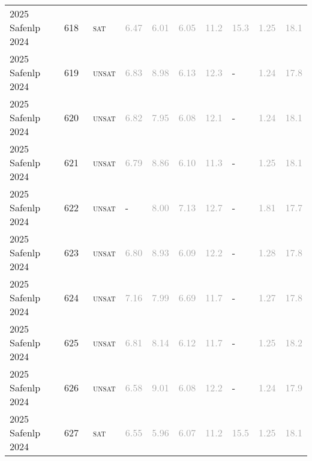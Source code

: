 \begin{center}
{\begin{longtable}{@{}llllllllll@{}}
2025 Safenlp 2024 & 618 & ~\textsc{sat} & \textcolor{darkgray}{6.47} & \textcolor{darkgray}{6.01} & \textcolor{darkgray}{6.05} & \textcolor{darkgray}{11.2} & \textcolor{darkgray}{15.3} & \textcolor{darkgray}{1.25} & \textcolor{darkgray}{18.1} \\
2025 Safenlp 2024 & 619 & ~\textsc{unsat} & \textcolor{darkgray}{6.83} & \textcolor{darkgray}{8.98} & \textcolor{darkgray}{6.13} & \textcolor{darkgray}{12.3} & - & \textcolor{darkgray}{1.24} & \textcolor{darkgray}{17.8} \\
2025 Safenlp 2024 & 620 & ~\textsc{unsat} & \textcolor{darkgray}{6.82} & \textcolor{darkgray}{7.95} & \textcolor{darkgray}{6.08} & \textcolor{darkgray}{12.1} & - & \textcolor{darkgray}{1.24} & \textcolor{darkgray}{18.1} \\
2025 Safenlp 2024 & 621 & ~\textsc{unsat} & \textcolor{darkgray}{6.79} & \textcolor{darkgray}{8.86} & \textcolor{darkgray}{6.10} & \textcolor{darkgray}{11.3} & - & \textcolor{darkgray}{1.25} & \textcolor{darkgray}{18.1} \\
2025 Safenlp 2024 & 622 & ~\textsc{unsat} & - & \textcolor{darkgray}{8.00} & \textcolor{darkgray}{7.13} & \textcolor{darkgray}{12.7} & - & \textcolor{darkgray}{1.81} & \textcolor{darkgray}{17.7} \\
2025 Safenlp 2024 & 623 & ~\textsc{unsat} & \textcolor{darkgray}{6.80} & \textcolor{darkgray}{8.93} & \textcolor{darkgray}{6.09} & \textcolor{darkgray}{12.2} & - & \textcolor{darkgray}{1.28} & \textcolor{darkgray}{17.8} \\
2025 Safenlp 2024 & 624 & ~\textsc{unsat} & \textcolor{darkgray}{7.16} & \textcolor{darkgray}{7.99} & \textcolor{darkgray}{6.69} & \textcolor{darkgray}{11.7} & - & \textcolor{darkgray}{1.27} & \textcolor{darkgray}{17.8} \\
2025 Safenlp 2024 & 625 & ~\textsc{unsat} & \textcolor{darkgray}{6.81} & \textcolor{darkgray}{8.14} & \textcolor{darkgray}{6.12} & \textcolor{darkgray}{11.7} & - & \textcolor{darkgray}{1.25} & \textcolor{darkgray}{18.2} \\
2025 Safenlp 2024 & 626 & ~\textsc{unsat} & \textcolor{darkgray}{6.58} & \textcolor{darkgray}{9.01} & \textcolor{darkgray}{6.08} & \textcolor{darkgray}{12.2} & - & \textcolor{darkgray}{1.24} & \textcolor{darkgray}{17.9} \\
2025 Safenlp 2024 & 627 & ~\textsc{sat} & \textcolor{darkgray}{6.55} & \textcolor{darkgray}{5.96} & \textcolor{darkgray}{6.07} & \textcolor{darkgray}{11.2} & \textcolor{darkgray}{15.5} & \textcolor{darkgray}{1.25} & \textcolor{darkgray}{18.1} \\

\end{longtable}}
\end{center}
